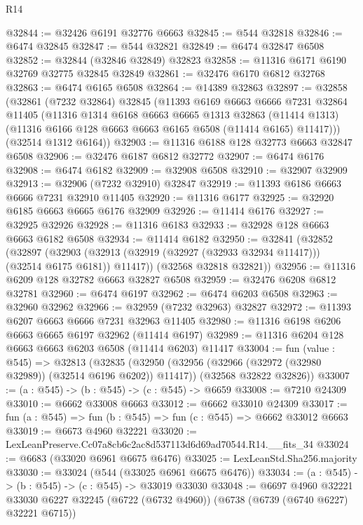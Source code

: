 \begin{lexlean}{R14}
\begin{coremodule}
@32844 := @32426 @6191 @32776 @6663
@32845 := @544 @32818
@32846 := @6474 @32845
@32847 := @544 @32821
@32849 := @6474 @32847 @6508
@32852 := @32844 (@32846 @32849) @32823
@32858 := @11316 @6171 @6190 @32769 @32775 @32845 @32849
@32861 := @32476 @6170 @6812 @32768
@32863 := @6474 @6165 @6508
@32864 := @14389 @32863
@32897 := @32858
    (@32861
      (@7232 @32864)
      @32845
      (@11393
        @6169
        @6663
        @6666
        @7231
        @32864
        @11405
        (@11316
          @1314
          @6168
          @6663
          @6665
          @1313
          @32863
          (@11414 @1313)
          (@11316 @6166 @128 @6663 @6663 @6165 @6508 (@11414 @6165) @11417)))
      (@32514 @1312 @6164))
@32903 := @11316 @6188 @128 @32773 @6663 @32847 @6508
@32906 := @32476 @6187 @6812 @32772
@32907 := @6474 @6176
@32908 := @6474 @6182
@32909 := @32908 @6508
@32910 := @32907 @32909
@32913 := @32906 (@7232 @32910) @32847
@32919 := @11393 @6186 @6663 @6666 @7231 @32910 @11405
@32920 := @11316 @6177
@32925 := @32920 @6185 @6663 @6665 @6176 @32909
@32926 := @11414 @6176
@32927 := @32925 @32926
@32928 := @11316 @6183
@32933 := @32928 @128 @6663 @6663 @6182 @6508
@32934 := @11414 @6182
@32950 := @32841
    (@32852
      (@32897
        (@32903 (@32913 (@32919 (@32927 (@32933 @32934 @11417))) (@32514 @6175 @6181)) @11417))
      (@32568 @32818 @32821))
@32956 := @11316 @6209 @128 @32782 @6663 @32827 @6508
@32959 := @32476 @6208 @6812 @32781
@32960 := @6474 @6197
@32962 := @6474 @6203 @6508
@32963 := @32960 @32962
@32966 := @32959 (@7232 @32963) @32827
@32972 := @11393 @6207 @6663 @6666 @7231 @32963 @11405
@32980 := @11316 @6198 @6206 @6663 @6665 @6197 @32962 (@11414 @6197)
@32989 := @11316 @6204 @128 @6663 @6663 @6203 @6508 (@11414 @6203) @11417
@33004 := fun (value : @545) =>
  @32813
    (@32835
      (@32950 (@32956 (@32966 (@32972 (@32980 @32989)) (@32514 @6196 @6202)) @11417))
      (@32568 @32822 @32826))
@33007 := (a : @545) -> (b : @545) -> (c : @545) -> @6659
@33008 := @7210 @24309
@33010 := @6662 @33008 @6663
@33012 := @6662 @33010 @24309
@33017 := fun (a : @545) => fun (b : @545) => fun (c : @545) => @6662 @33012 @6663
@33019 := @6673 @4960 @32221
@33020 := LexLeanPreserve.Cc07a8cb6c2ac8d537113d6d69ad70544.R14.__fits_34
@33024 := @6683 (@33020 @6961 @6675 @6476)
@33025 := LexLeanStd.Sha256.majority
@33030 := @33024 (@544 (@33025 @6961 @6675 @6476))
@33034 := (a : @545) -> (b : @545) -> (c : @545) -> @33019 @33030
@33048 := @6697
    @4960
    @32221
    @33030
    @6227
    @32245
    (@6722 (@6732 @4960))
    (@6738 (@6739 (@6740 @6227) @32221 @6715))

\end{coremodule}
\end{lexlean}
